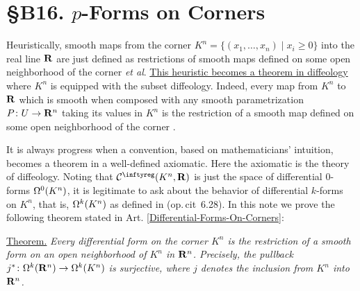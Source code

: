 
\chapter*{\S B16. $p$-Forms on Corners}
\setcounter{footnote}{0}


\begin{abstract}
  In this note we shall see that,
  for the subset diffeology,
  differential forms defined on half-spaces or corners of Euclidean spaces
  are the restrictions of differential forms defined on an open neighborhood of the corner in the ambient Euclidean space.
\end{abstract}


Heuristically,
smooth maps from the corner $K^n = \{(x_1,\dots,x_n) \mid x_i \geq 0\}$ into the real line $\mathbf{R}$ are just defined as restrictions of smooth maps
defined on some open neighborhood of the corner \cite{Cer61} \cite{Dou62} \emph{et al}.
\uline{This heuristic becomes a theorem in diffeology} where $K^n$ is equipped with the subset diffeology.
Indeed,
every map from $K^n$ to $\mathbf{R}$ which is smooth when composed with any smooth parametrization $P \colon U \to \mathbf{R}^n$ taking its values in $K^n$
is the restriction of a smooth map defined on some open neighborhood of the corner \cite[\textsection\,4.16]{PIZ13}.

It is always progress when a convention,
based on mathematicians' intuition,
becomes a theorem in a well-defined axiomatic.
Here the axiomatic is the theory of diffeology.
Noting that $\Cinfty(K^n, \RR)$ is just the space of differential $0$-forms $\Omega^0(K^n)$,
it is legitimate to ask about the behavior of differential $k$-forms on $K^n$,
that is,
$\Omega^k(K^n)$ as defined in (op.\,cit \textsection\,6.28).
In this note we prove the following theorem stated in Art. \ref{Differential-Forms-On-Corners}:

\uline{Theorem.} {\itshape Every differential form on the corner $K^n$ is the restriction of a smooth form on an open neighborhood of $K^n$ in $\mathbf{R}^n$.
Precisely,
the pullback $j^* \colon \Omega^k(\mathbf{R}^n) \to \Omega^k(K^n)$ is surjective,
where $j$ denotes the inclusion from $K^n$ into $\mathbf{R}^n$.}

